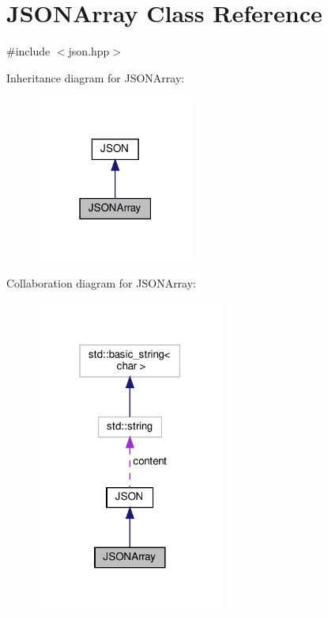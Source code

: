\hypertarget{class_j_s_o_n_array}{}\section{J\+S\+O\+N\+Array Class Reference}
\label{class_j_s_o_n_array}


{\ttfamily \#include $<$json.\+hpp$>$}



Inheritance diagram for J\+S\+O\+N\+Array\+:
\nopagebreak
\begin{figure}[H]
\begin{center}
\leavevmode
\includegraphics[width=147pt]{class_j_s_o_n_array__inherit__graph}
\end{center}
\end{figure}


Collaboration diagram for J\+S\+O\+N\+Array\+:
\nopagebreak
\begin{figure}[H]
\begin{center}
\leavevmode
\includegraphics[width=175pt]{class_j_s_o_n_array__coll__graph}
\end{center}
\end{figure}
